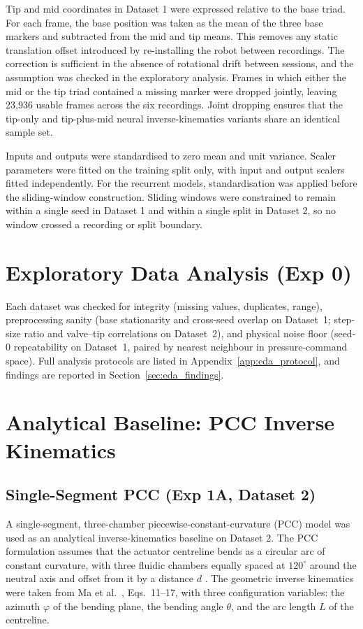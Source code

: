 Tip and mid coordinates in Dataset 1 were expressed relative to the base triad. For each frame, the base position was taken as the mean of the three base markers and subtracted from the mid and tip means. This removes any static translation offset introduced by re-installing the robot between recordings. The correction is sufficient in the absence of rotational drift between sessions, and the assumption was checked in the exploratory analysis. Frames in which either the mid or the tip triad contained a missing marker were dropped jointly, leaving 23{,}936 usable frames across the six recordings. Joint dropping ensures that the tip-only and tip-plus-mid neural inverse-kinematics variants share an identical sample set.

Inputs and outputs were standardised to zero mean and unit variance. Scaler parameters were fitted on the training split only, with input and output scalers fitted independently. For the recurrent models, standardisation was applied before the sliding-window construction. Sliding windows were constrained to remain within a single seed in Dataset 1 and within a single split in Dataset 2, so no window crossed a recording or split boundary.

\section{Exploratory Data Analysis (Exp 0)}
\label{sec:eda}

Each dataset was checked for integrity (missing values, duplicates, range), preprocessing sanity (base stationarity and cross-seed overlap on Dataset~1; step-size ratio and valve--tip correlations on Dataset~2), and physical noise floor (seed-0 repeatability on Dataset~1, paired by nearest neighbour in pressure-command space). Full analysis protocols are listed in Appendix~\ref{app:eda_protocol}, and findings are reported in Section~\ref{sec:eda_findings}.

\section{Analytical Baseline: PCC Inverse Kinematics}

\subsection{Single-Segment PCC (Exp 1A, Dataset 2)}
\label{sec:pcc_single}

A single-segment, three-chamber piecewise-constant-curvature (PCC) model was used as an analytical inverse-kinematics baseline on Dataset 2. The PCC formulation assumes that the actuator centreline bends as a circular arc of constant curvature, with three fluidic chambers equally spaced at $120^{\circ}$ around the neutral axis and offset from it by a distance $d$ \cite{webster2010review}. The geometric inverse kinematics were taken from Ma et al.\ \cite{ma2022bp}, Eqs.\ 11--17, with three configuration variables: the azimuth $\varphi$ of the bending plane, the bending angle $\theta$, and the arc length $L$ of the centreline.

